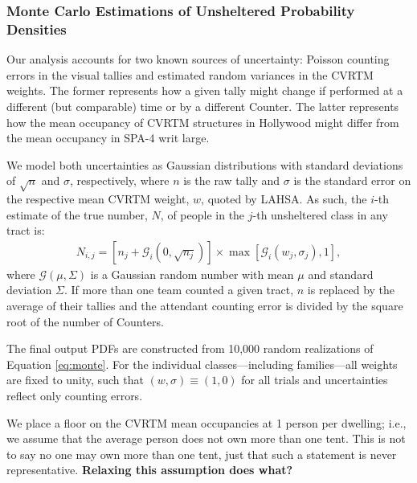 \documentclass[11pt,twocolumn]{article}
\def\bfr{\bf\color{red}}
\def\resp{respectively}
\begin{document}
%
%

\subsubsection{Monte Carlo Estimations of Unsheltered Probability Densities}
\label{sec:mc}

Our analysis accounts for two known sources of uncertainty: Poisson counting errors in the visual
tallies and estimated random variances in the CVRTM weights. The former represents how a given
tally might change if performed at a different (but comparable) time or by a different Counter. The 
latter represents how the mean occupancy of CVRTM structures in Hollywood might differ from
the mean occupancy in SPA-4 writ large. 

We model both uncertainties as Gaussian distributions with standard deviations of 
$\sqrt{n}$ and $\sigma$, \resp, where $n$ is the raw tally and $\sigma$ is the standard error on the 
respective mean CVRTM weight, $w$, quoted by LAHSA. As such, the $i$-th estimate of the true 
number, $N$, of people in the $j$-th unsheltered class in any tract is:
\begin{multline}\label{eq:monte}
	N_{i,j} = \left[n_{j} + \mathcal{G}_{i}(0,\sqrt{n_{j}})\right]\times\max[\mathcal{G}_{i}(w_{j}, \sigma_{j}),1],
\end{multline}
where $\mathcal{G}(\mu,\Sigma)$ is a Gaussian random number with mean $\mu$ and standard deviation 
$\Sigma$. If more than one team counted a given tract, $n$ is replaced by the average of their tallies 
and the attendant counting error is divided by the square root of the number of Counters.

The final output PDFs are constructed from 10,000 random realizations of Equation \ref{eq:monte}. 
For the individual classes---including families---all weights are 
fixed to unity, such that $(w,\sigma)\equiv(1,0)$ for all trials and uncertainties reflect only 
counting errors.

We place a floor on the CVRTM mean occupancies at 1 person per dwelling; i.e., we assume that the average
person does not own more than one tent. This is not to say no one may own more than one tent, just that
such a statement is never representative. {\bfr Relaxing this assumption does what?} 
\end{document}
